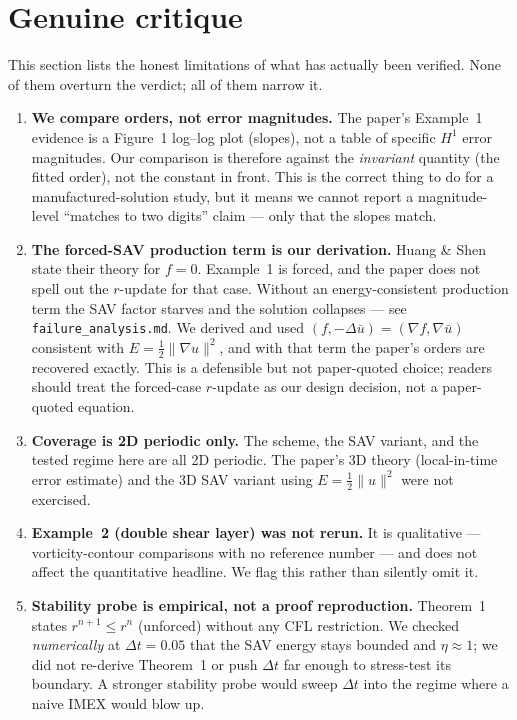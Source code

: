 \documentclass[11pt]{article}
\begin{document}
\section{Genuine critique}

This section lists the honest limitations of what has actually been
verified. None of them overturn the verdict; all of them narrow it.

\begin{enumerate}[leftmargin=1.6em]
  \item \textbf{We compare orders, not error magnitudes.} The paper's
        Example~1 evidence is a Figure~1 log--log plot (slopes), not a
        table of specific $H^1$ error magnitudes. Our comparison is
        therefore against the \emph{invariant} quantity (the fitted order),
        not the constant in front. This is the correct thing to do for a
        manufactured-solution study, but it means we cannot report a
        magnitude-level ``matches to two digits'' claim --- only that the
        slopes match.

  \item \textbf{The forced-SAV production term is our derivation.} Huang \&
        Shen state their theory for $f=0$. Example~1 is forced, and the
        paper does not spell out the $r$-update for that case. Without an
        energy-consistent production term the SAV factor starves and the
        solution collapses --- see \texttt{failure\_analysis.md}. We
        derived and used $(f,-\Delta\bar u)=(\nabla f,\nabla\bar u)$
        consistent with $E=\tfrac12\|\nabla u\|^2$, and with that term the
        paper's orders are recovered exactly. This is a defensible but
        not paper-quoted choice; readers should treat the forced-case
        $r$-update as our design decision, not a paper-quoted equation.

  \item \textbf{Coverage is 2D periodic only.} The scheme, the SAV
        variant, and the tested regime here are all 2D periodic. The
        paper's 3D theory (local-in-time error estimate) and the 3D SAV
        variant using $E=\tfrac12\|u\|^2$ were not exercised.

  \item \textbf{Example~2 (double shear layer) was not rerun.} It is
        qualitative --- vorticity-contour comparisons with no reference
        number --- and does not affect the quantitative headline. We flag
        this rather than silently omit it.

  \item \textbf{Stability probe is empirical, not a proof reproduction.}
        Theorem~1 states $r^{n+1}\le r^n$ (unforced) without any CFL
        restriction. We checked \emph{numerically} at $\Delta t=0.05$ that
        the SAV energy stays bounded and $\eta\approx 1$; we did not
        re-derive Theorem~1 or push $\Delta t$ far enough to stress-test
        its boundary. A stronger stability probe would sweep $\Delta t$
        into the regime where a naive IMEX would blow up.


\end{enumerate}
\end{document}
